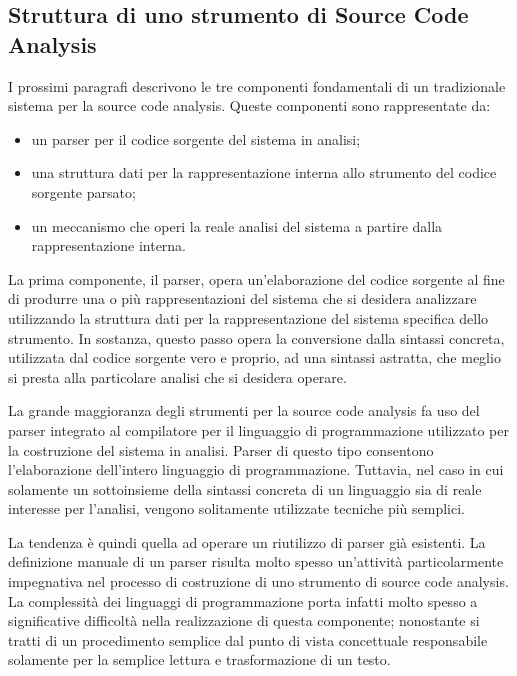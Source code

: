 \subsection{Struttura di uno strumento di Source Code Analysis}
\label{sca-architecture}

I prossimi paragrafi descrivono le tre componenti fondamentali di un
tradizionale sistema per la source code analysis. Queste componenti sono
rappresentate da:

\begin{itemize}

\item un parser per il codice sorgente del sistema in analisi;

\item una struttura dati per la rappresentazione interna allo strumento del
codice sorgente parsato;

\item un meccanismo che operi la reale analisi del sistema a partire dalla
rappresentazione interna.

\end{itemize}

La prima componente, il parser, opera un'elaborazione del codice sorgente al
fine di produrre una o più rappresentazioni del sistema che si desidera
analizzare utilizzando la struttura dati per la rappresentazione del sistema
specifica dello strumento. In sostanza, questo passo opera la conversione dalla
sintassi concreta, utilizzata dal codice sorgente vero e proprio, ad una
sintassi astratta, che meglio si presta alla particolare analisi che si desidera
operare.

La grande maggioranza degli strumenti per la source code analysis fa uso del
parser integrato al compilatore per il linguaggio di programmazione utilizzato
per la costruzione del sistema in analisi. Parser di questo tipo consentono
l’elaborazione dell’intero linguaggio di programmazione. Tuttavia, nel caso in
cui solamente un sottoinsieme della sintassi concreta di un linguaggio sia di
reale interesse per l’analisi, vengono solitamente utilizzate tecniche più
semplici.

La tendenza è quindi quella ad operare un riutilizzo di parser già esistenti. La
definizione manuale di un parser risulta molto spesso un'attività
particolarmente impegnativa nel processo di costruzione di uno strumento di
source code analysis. La complessità dei linguaggi di programmazione porta
infatti molto spesso a significative difficoltà nella realizzazione di questa
componente; nonostante si tratti di un procedimento semplice dal punto di vista
concettuale responsabile solamente per la semplice lettura e trasformazione di
un testo.

